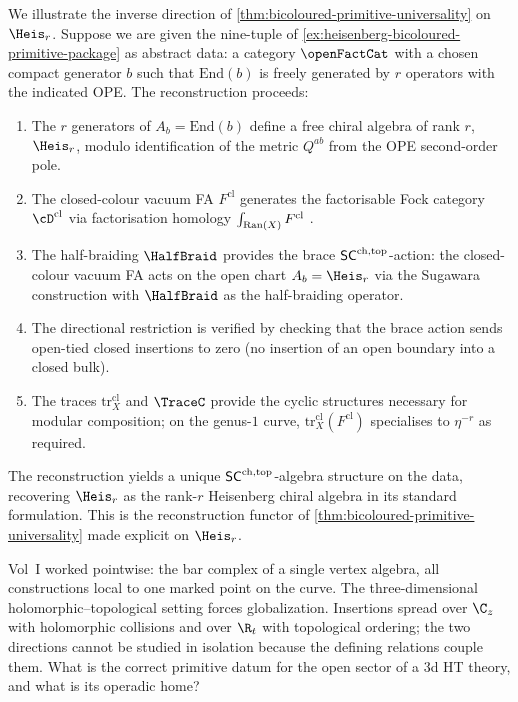 \begin{example}
\label{ex:heisenberg-reconstruction}%
We illustrate the inverse direction of
\cref{thm:bicoloured-primitive-universality} on $\Heis_r$.
Suppose we are given the nine-tuple of
\cref{ex:heisenberg-bicoloured-primitive-package} as abstract
data: a category $\openFactCat$ with a chosen compact generator
$b$ such that $\mathrm{End}(b)$ is freely generated by $r$
operators with the indicated OPE. The reconstruction proceeds:
\begin{enumerate}
\item The $r$ generators of $A_b = \mathrm{End}(b)$ define a free
chiral algebra of rank $r$, $\Heis_r$, modulo identification of
the metric $Q^{ab}$ from the OPE second-order pole.
\item The closed-colour vacuum FA $F^{\mathrm{cl}}$ generates the
factorisable Fock category $\cD^{\mathrm{cl}}$ via factorisation
homology $\int_{\mathrm{Ran}(X)} F^{\mathrm{cl}}$
\cite[\S 5.5]{HA}.
\item The half-braiding $\HalfBraid$ provides the brace
$\mathsf{SC}^{\mathrm{ch},\mathrm{top}}$-action: the closed-colour vacuum FA acts on the open
chart $A_b = \Heis_r$ via the Sugawara construction with $\HalfBraid$
as the half-braiding operator.
\item The directional restriction is verified by checking that
the brace action sends open-tied closed insertions to zero
\textup(no insertion of an open boundary into a closed bulk\textup).
\item The traces $\mathrm{tr}^{\mathrm{cl}}_X$ and $\TraceC$ provide
the cyclic structures necessary for modular composition; on the
genus-$1$ curve, $\mathrm{tr}^{\mathrm{cl}}_X(F^{\mathrm{cl}})$
specialises to $\eta^{-r}$ as required.
\end{enumerate}
The reconstruction yields a unique $\mathsf{SC}^{\mathrm{ch},\mathrm{top}}$-algebra structure
on the data, recovering $\Heis_r$ as the rank-$r$ Heisenberg
chiral algebra in its standard formulation. This is
the reconstruction functor of
\cref{thm:bicoloured-primitive-universality} made explicit on $\Heis_r$.
\end{example}

Vol~I worked pointwise: the bar complex of a single vertex algebra,
all constructions local to one marked point on the curve. The
three-dimensional holomorphic--topological setting forces
globalization. Insertions spread over $\C_z$ with holomorphic
collisions and over $\R_t$ with topological ordering; the two
directions cannot be studied in isolation because the defining
relations couple them. What is the correct primitive datum for
the open sector of a 3d HT theory, and what is its operadic
home?

